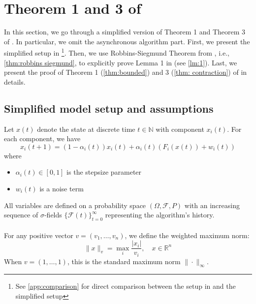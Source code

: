 \section{Theorem 1 and 3 of \cite{tsitsiklis1994asynchronous}}\label{sec:1}

In this section, we go through a simplified version of Theorem 1 and Theorem 3 of \cite{tsitsiklis1994asynchronous}. In particular, we omit the asynchronous algorithm part. First, we present the simplified setup in \cite{tsitsiklis1994asynchronous}\footnote{See \autoref{app:comparison} for direct comparison between the setup in \cite{tsitsiklis1994asynchronous} and the simplified setup}. Then, we use Robbins-Siegmund Theorem from \cite{robbins1971convergence}, i.e., \autoref{thm:robbins siegmund}, to explicitly prove Lemma 1 in \cite{tsitsiklis1994asynchronous} (see \autoref{lm:1}). Last, we present the proof of Theorem 1 (\autoref{thm:bounded}) and 3 (\autoref{thm: contraction}) of \cite{tsitsiklis1994asynchronous} in details.
\subsection{Simplified model setup and assumptions}\label{sub:simple setup}
Let $x(t)$ denote the state at discrete time $t\in\mathbb{N}$ with component $x_i(t)$. For each component, we have
$$
x_i(t+1) = (1-\alpha_i(t))x_i(t) + \alpha_i(t)(F_i(x(t)) + w_i(t)) 
$$
where
\begin{itemize}
    \item $\alpha_i(t) \in [0,1]$ is the stepsize parameter
    \item $w_i(t)$ is a noise term
\end{itemize}
All variables are defined on a probability space $(\Omega, \mathcal{F}, P)$ with an increasing sequence of $\sigma$-fields $\{\mathcal{F}(t)\}_{t=0}^{\infty}$ representing the algorithm's history. \\
\\
For any positive vector $v = (v_1, \ldots, v_n)$, we define the weighted maximum norm:
\begin{equation}\label{eq:weighted norm}
\|x\|_v = \max_i \frac{|x_i|}{v_i}, \quad x \in \mathbb{R}^n
\end{equation}
\noindent When $v = (1,\ldots,1)$, this is the standard maximum norm $\|\cdot\|_{\infty}$.\\
\noindent

